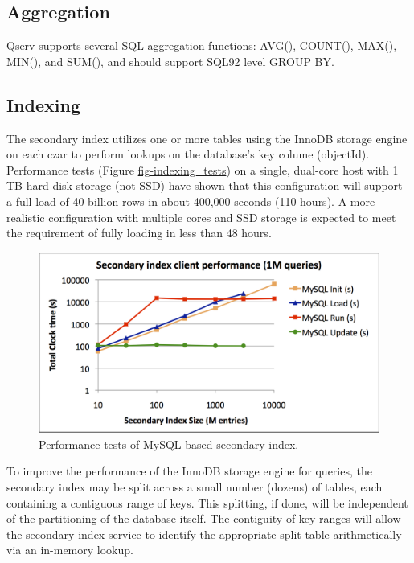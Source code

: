 \documentclass[DM,lsstdraft,toc]{lsstdoc}
\begin{document}
\subsection{Aggregation}\label{aggregation}

Qserv supports several SQL aggregation functions: AVG(), COUNT(), MAX(),
MIN(), and SUM(), and should support SQL92 level GROUP BY.

\subsection{Indexing}\label{indexing-1}

The secondary index utilizes one or more tables using the InnoDB storage
engine on each czar to perform lookups on the database's key colume
(objectId). Performance tests (Figure \href{}{fig-indexing\_tests}) on a
single, dual-core host with 1 TB hard disk storage (not SSD) have shown
that this configuration will support a full load of 40 billion rows in
about 400,000 seconds (110 hours). A more realistic configuration with
multiple cores and SSD storage is expected to meet the requirement of
fully loading in less than 48 hours.

\begin{figure}[H]
\centering
\includegraphics[width=\textwidth]{_static/indexing_tests.png}
\caption{Performance tests of MySQL-based secondary index.}
\end{figure}

To improve the performance of the InnoDB storage engine for queries, the
secondary index may be split across a small number (dozens) of tables,
each containing a contiguous range of keys. This splitting, if done,
will be independent of the partitioning of the database itself. The
contiguity of key ranges will allow the secondary index service to
identify the appropriate split table arithmetically via an in-memory
lookup.
\end{document}
